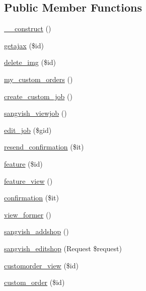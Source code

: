 \subsection*{Public Member Functions}
\begin{DoxyCompactItemize}
\item 
\mbox{\hyperlink{class_responsive_1_1_http_1_1_controllers_1_1_gigs_controller_a095c5d389db211932136b53f25f39685}{\+\_\+\+\_\+construct}} ()
\item 
\mbox{\hyperlink{class_responsive_1_1_http_1_1_controllers_1_1_gigs_controller_a4835696e5f4f4682a41359c1c5192a28}{getajax}} (\$id)
\item 
\mbox{\hyperlink{class_responsive_1_1_http_1_1_controllers_1_1_gigs_controller_a0b688002d24e9c1235aa0c96456e28b4}{delete\+\_\+img}} (\$id)
\item 
\mbox{\hyperlink{class_responsive_1_1_http_1_1_controllers_1_1_gigs_controller_a0bde17da10f6d25317648760e0c61371}{my\+\_\+custom\+\_\+orders}} ()
\item 
\mbox{\hyperlink{class_responsive_1_1_http_1_1_controllers_1_1_gigs_controller_a12c76d840ce9ab821c229e8acddfa697}{create\+\_\+custom\+\_\+job}} ()
\item 
\mbox{\hyperlink{class_responsive_1_1_http_1_1_controllers_1_1_gigs_controller_a3c33afeae3bc99aae236c2cf6cc8de1d}{sangvish\+\_\+viewjob}} ()
\item 
\mbox{\hyperlink{class_responsive_1_1_http_1_1_controllers_1_1_gigs_controller_aa3d2f009255ad0614e23fd165aa9b332}{edit\+\_\+job}} (\$gid)
\item 
\mbox{\hyperlink{class_responsive_1_1_http_1_1_controllers_1_1_gigs_controller_a74554f9e8baf213314259dc90918da34}{resend\+\_\+confirmation}} (\$it)
\item 
\mbox{\hyperlink{class_responsive_1_1_http_1_1_controllers_1_1_gigs_controller_ad4318a6b3d8bb110cb44af152f9df7f1}{feature}} (\$id)
\item 
\mbox{\hyperlink{class_responsive_1_1_http_1_1_controllers_1_1_gigs_controller_aa85b054fcf6fcf22e84df0e8e708369a}{feature\+\_\+view}} ()
\item 
\mbox{\hyperlink{class_responsive_1_1_http_1_1_controllers_1_1_gigs_controller_a75c4acb831d0624f784c3c0e49e0ad32}{confirmation}} (\$it)
\item 
\mbox{\hyperlink{class_responsive_1_1_http_1_1_controllers_1_1_gigs_controller_aac46d13297bfa2039955bbd50d414ec0}{view\+\_\+former}} ()
\item 
\mbox{\hyperlink{class_responsive_1_1_http_1_1_controllers_1_1_gigs_controller_a94ca394576518bac9378129d4e6698ce}{sangvish\+\_\+addshop}} ()
\item 
\mbox{\hyperlink{class_responsive_1_1_http_1_1_controllers_1_1_gigs_controller_a91ccb31ea3618b9969dcd4bca9108803}{sangvish\+\_\+editshop}} (Request \$request)
\item 
\mbox{\hyperlink{class_responsive_1_1_http_1_1_controllers_1_1_gigs_controller_af645df080dbc48a9ce0fcacb6b31b7db}{customorder\+\_\+view}} (\$id)
\item 
\mbox{\hyperlink{class_responsive_1_1_http_1_1_controllers_1_1_gigs_controller_adc63b288acdb243fe38a3b6418dcce09}{custom\+\_\+order}} (\$id)
\end{DoxyCompactItemize}
